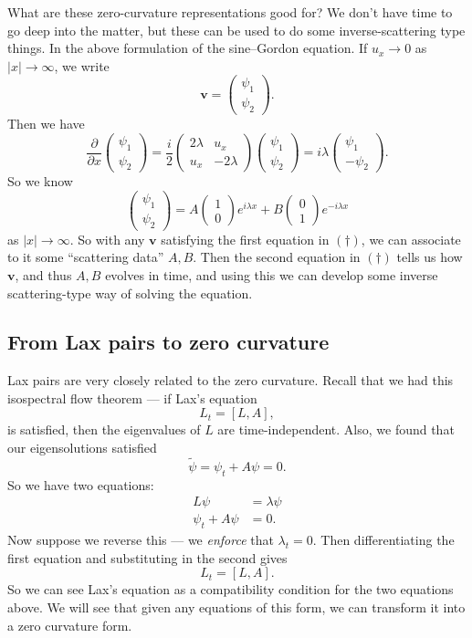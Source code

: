 \documentclass[a4paper]{article}
\begin{document}
What are these zero-curvature representations good for? We don't have time to go deep into the matter, but these can be used to do some inverse-scattering type things. In the above formulation of the sine--Gordon equation. If $u_x \to 0$ as $|x| \to \infty$, we write
\[
  \mathbf{v} =
  \begin{pmatrix}
    \psi_1\\
    \psi_2
  \end{pmatrix}.
\]
Then we have
\[
  \frac{\partial}{\partial x}
  \begin{pmatrix}
    \psi_1\\
    \psi_2
  \end{pmatrix}
  = \frac{i}{2}
  \begin{pmatrix}
    2\lambda & u_x\\
    u_x & -2\lambda
  \end{pmatrix}
  \begin{pmatrix}
    \psi_1\\
    \psi_2
  \end{pmatrix} = i\lambda
  \begin{pmatrix}
    \psi_1\\
    -\psi_2
  \end{pmatrix}.
\]
So we know
\[
  \begin{pmatrix}
    \psi_1\\
    \psi_2
  \end{pmatrix} =
  A
  \begin{pmatrix}
    1\\0
  \end{pmatrix}
  e^{i\lambda x} + B
  \begin{pmatrix}
    0 \\1
  \end{pmatrix}
  e^{-i\lambda x}
\]
as $|x| \to \infty$. So with any $\mathbf{v}$ satisfying the first equation in $(\dagger)$, we can associate to it some ``scattering data'' $A, B$. Then the second equation in $(\dagger)$ tells us how $\mathbf{v}$, and thus $A, B$ evolves in time, and using this we can develop some inverse scattering-type way of solving the equation.

\subsection{From Lax pairs to zero curvature}
Lax pairs are very closely related to the zero curvature. Recall that we had this isospectral flow theorem --- if Lax's equation
\[
  L_t = [L, A],
\]
is satisfied, then the eigenvalues of $L$ are time-independent. Also, we found that our eigensolutions satisfied
\[
  \tilde{\psi} = \psi_t + A \psi = 0.
\]
So we have two equations:
\begin{align*}
  L \psi &= \lambda \psi\\
  \psi_t + A \psi &= 0.
\end{align*}
Now suppose we reverse this --- we \emph{enforce} that $\lambda_t = 0$. Then differentiating the first equation and substituting in the second gives
\[
  L_t = [L, A].
\]
So we can see Lax's equation as a compatibility condition for the two equations above. We will see that given any equations of this form, we can transform it into a zero curvature form.
\end{document}
